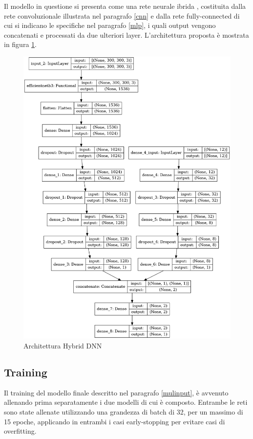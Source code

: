     Il modello in questione si presenta come una rete neurale ibrida \cite{yuan2020hybriddnns}, costituita dalla rete convoluzionale illustrata nel paragrafo \ref{cnn} e dalla rete fully-connected di cui si indicano le specifiche nel paragrafo \ref{mlp}, i quali output vengono concatenati e processati da due ulteriori layer.
    L'architettura proposta è mostrata in figura \ref{fig:model}.
        \begin{figure}[H]
            \centering
            \includegraphics[scale=0.35]{Plot/Model-Plot.png}
            \caption{Architettura Hybrid DNN}
            \label{fig:model}
        \end{figure}

    \subsection{Training}
    Il training del modello finale descritto nel paragrafo \ref{mulinput}, è avvenuto allenando prima separatamente i due modelli di cui è composto. Entrambe le reti sono state 
    allenate utilizzando una grandezza di batch di 32, per un massimo di 15 epoche, applicando in entrambi i casi early-stopping per evitare casi di overfitting. 

